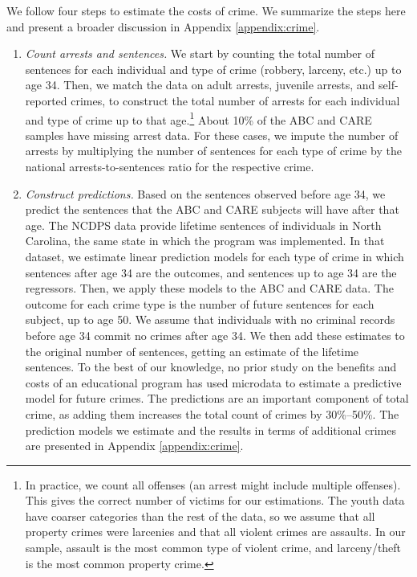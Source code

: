 We follow four steps to estimate the costs of crime. We summarize the steps here and present a broader discussion in Appendix \ref{appendix:crime}.

\begin{enumerate}
\item \textit{Count arrests and sentences.} We start by counting the total number of sentences for each individual and type of crime (robbery, larceny, etc.) up to age 34. Then, we match the data on adult arrests, juvenile arrests, and self-reported crimes, to construct the total number of  arrests for each individual and type of crime up to that age.\footnote{In practice, we count all offenses (an arrest might include multiple offenses). This gives the correct number of victims for our estimations. The youth data have coarser categories than the rest of the data, so we assume that all property crimes were larcenies and that all violent crimes are assaults. In our sample, assault is the most common type of violent crime, and larceny/theft is the most common property crime.} About 10\% of the ABC and CARE samples have missing arrest data. For these cases, we impute the number of arrests by multiplying the number of sentences for each type of crime by the  national arrests-to-sentences ratio for the respective crime.
\item \textit{Construct predictions.} Based on the sentences observed before age 34, we predict the sentences that the ABC and CARE subjects will have after that age. The NCDPS data provide lifetime sentences of individuals in North Carolina, the same state in which the program was implemented. In that dataset, we estimate linear prediction models for each type of crime in which sentences after age 34 are the outcomes, and sentences up to age 34 are the regressors. Then, we apply these models to the ABC and CARE data. The outcome for each crime type is the number of future sentences for each subject, up to age 50. We assume that individuals with no criminal records before age 34 commit no crimes after age 34. We then add these estimates to the original number of sentences, getting an estimate of the lifetime sentences. To the best of our knowledge, no prior study on the benefits and costs of an educational program has used microdata to estimate a predictive model for future crimes. The predictions are an important component of total crime, as adding them increases the total count of crimes by 30\%--50\%. The prediction models we estimate and the results in terms of additional crimes are presented in Appendix \ref{appendix:crime}.

\end{enumerate}
